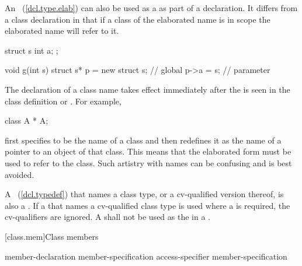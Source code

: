 \pnum
{}%
%
\begin{note}
An ~(\ref{dcl.type.elab}) can also
be used as a  as part of a declaration. It
differs from a class declaration in that if a class of the elaborated
name is in scope the elaborated name will refer to it.
\end{note}
\begin{example}

\begin{codeblock}
struct s { int a; };

void g(int s) {
  struct s* p = new struct s;   // global 
  p->a = s;                     // parameter 
}
\end{codeblock}
\end{example}

\pnum
{}%
\begin{note}
The declaration of a class name takes effect immediately after the
 is seen in the class definition or
. For example,

\begin{codeblock}
class A * A;
\end{codeblock}

first specifies  to be the name of a class and then redefines
it as the name of a pointer to an object of that class. This means that
the elaborated form   must be used to refer to the
class. Such artistry with names can be confusing and is best avoided.
\end{note}

\pnum
{}%
A ~(\ref{dcl.typedef}) that names a class type,
or a cv-qualified version thereof, is also a . If a
 that names a cv-qualified class type is used
where a  is required, the cv-qualifiers are
ignored. A  shall not be used as the
 in a .

[class.mem]{Class members}%
%

\begin{bnf}
\br
    member-declaration member-specification\opt\br
    access-specifier \terminal{:} member-specification\opt
\end{bnf}

